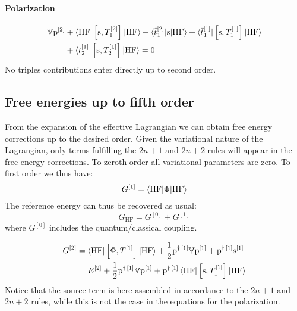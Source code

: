 \paragraph*{Polarization}
  \begin{equation}\label{eq:2nd-order-pol}
    \begin{aligned}
    \mathbb{V}\mathrm{p}^{[2]} &+
    \braket{\mathrm{HF} | \left[ \mathrm{s}, T_1^{[2]} \right]^{}| \mathrm{HF}}
    + \braket{\bar{t}_{1}^{[2]} | \mathrm{s} | \mathrm{HF} }
    + \braket{\bar{t}_{1}^{[1]} | \left[ \mathrm{s}, T_1^{[1]} \right]^{} | \mathrm{HF}}
    \\
    &+
    \braket{\bar{t}_{2}^{[1]} | \left[ \mathrm{s}, T_2^{[1]} \right]^{} | \mathrm{HF}}
    = 0
  \end{aligned}
  \end{equation}
No triples contributions enter directly up to second order.

\subsection{Free energies up to fifth order}\label{sec:energies-pt}

From the expansion of the effective Lagrangian we can obtain free energy
corrections up to the desired order. Given the variational nature of the
Lagrangian, only terms fulfilling the $2n+1$ and $2n+2$ rules will
appear in the free energy corrections.
To zeroth-order all variational parameters are zero. To first order we
thus have:
\begin{equation}\label{eq:first-order-G}
  G^{[1]} = \braket{\mathrm{HF} | \Phi | \mathrm{HF}}
\end{equation}
The reference energy can thus be recovered as usual:
\begin{equation}
  G_\mathrm{HF} = G^{[0]} + G^{[1]}
\end{equation}
where $G^{[0]}$ includes the quantum/classical coupling.

\begin{equation}\label{eq:second-order-G}
  \begin{aligned}
  G^{[2]} &= \braket{\mathrm{HF} | \left[ \Phi, T^{[1]} \right]^{} | \mathrm{HF}}
  + \frac{1}{2}\mathrm{p}^{\dagger\,[1]}\mathbb{V}\mathrm{p}^{[1]} +
  \mathrm{p}^{\dagger\,[1]}\tilde{\mathrm{s}}^{[1]} \\
  &= E^{[2]} + \frac{1}{2}\mathrm{p}^{\dagger\,[1]}\mathbb{V}\mathrm{p}^{[1]} +
  \mathrm{p}^{\dagger\,[1]}
  \braket{\mathrm{HF} | \left[ \mathrm{s}, T^{[1]}_1 \right]^{} | \mathrm{HF}}
  \end{aligned}
\end{equation}
Notice that the source term is here assembled in accordance to the $2n+1$
and $2n+2$ rules, while this is not the case in the equations for the
polarization.

